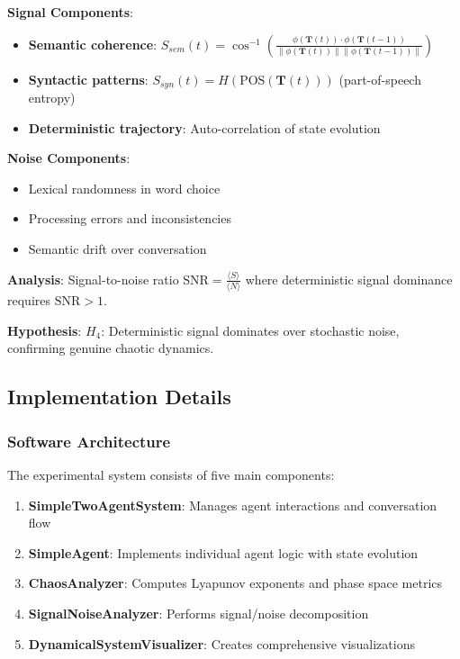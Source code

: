 \documentclass[11pt,a4paper]{article}
\begin{document}
\textbf{Signal Components}:
\begin{itemize}
    \item \textbf{Semantic coherence}: $S_{sem}(t) = \cos^{-1}\left(\frac{\phi(\mathbf{T}(t)) \cdot \phi(\mathbf{T}(t-1))}{\|\phi(\mathbf{T}(t))\| \|\phi(\mathbf{T}(t-1))\|}\right)$
    \item \textbf{Syntactic patterns}: $S_{syn}(t) = H(\text{POS}(\mathbf{T}(t)))$ (part-of-speech entropy)
    \item \textbf{Deterministic trajectory}: Auto-correlation of state evolution
\end{itemize}

\textbf{Noise Components}:
\begin{itemize}
    \item Lexical randomness in word choice
    \item Processing errors and inconsistencies
    \item Semantic drift over conversation
\end{itemize}

\textbf{Analysis}: Signal-to-noise ratio $\text{SNR} = \frac{\langle S \rangle}{\langle N \rangle}$ where deterministic signal dominance requires $\text{SNR} > 1$.

\textbf{Hypothesis}: $H_4$: Deterministic signal dominates over stochastic noise, confirming genuine chaotic dynamics.

\subsection{Implementation Details}

\subsubsection{Software Architecture}

The experimental system consists of five main components:

\begin{enumerate}
    \item \textbf{SimpleTwoAgentSystem}: Manages agent interactions and conversation flow
    \item \textbf{SimpleAgent}: Implements individual agent logic with state evolution
    \item \textbf{ChaosAnalyzer}: Computes Lyapunov exponents and phase space metrics
    \item \textbf{SignalNoiseAnalyzer}: Performs signal/noise decomposition
    \item \textbf{DynamicalSystemVisualizer}: Creates comprehensive visualizations
\end{enumerate}
\end{document}
